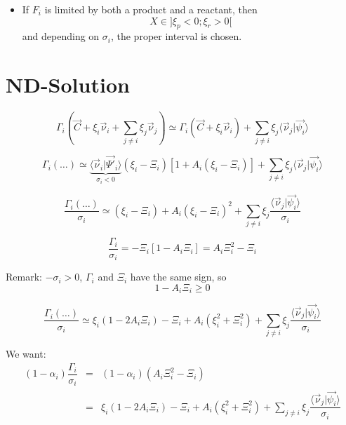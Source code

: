 \documentclass[aps,12pt]{revtex4}
\begin{document}
\begin{itemize}
\begin{itemize}
	\item If $F_i$ is limited by both a product and a reactant, then $$X\in\rbrack \xi_p < 0 ; \xi_r > 0 \lbrack$$
	and depending on $\sigma_i$, the proper interval is chosen.
	\end{itemize}
	
\end{itemize}

\section{ND-Solution} 	


\begin{equation}
	\Gamma_i\left(\vec{C} + \xi_i \vec{\nu}_i + \sum_{j\not=i} \xi_j \vec{\nu}_j \right) 
	\simeq 
	\Gamma_i(\vec{C} + \xi_i \vec{\nu}_i) + \sum_{j\not=i} \xi_j \langle \vec{\nu}_j \vert \vec{\psi_i} \rangle
\end{equation}

\begin{equation}
	\Gamma_i(\ldots) \simeq \underbrace{\langle \vec{\nu}_i \vert \vec{\Psi'}_i\rangle}_{\sigma_i<0} \left(\xi_i - \Xi_i\right)\left[ 1 + A_i \left(\xi_i - \Xi_i\right)\right] + \sum_{j\not=i} \xi_j \langle \vec{\nu}_j \vert \vec{\psi_i} \rangle
\end{equation}

\begin{equation}
	\dfrac{\Gamma_i(\ldots)}{\sigma_i} \simeq (\xi_i - \Xi_i) + A_i (\xi_i - \Xi_i)^2 + \sum_{j\not=i} \xi_j \dfrac{\langle \vec{\nu}_j \vert \vec{\psi_i} \rangle}{\sigma_i}
\end{equation}

\begin{equation}
	\dfrac{\Gamma_i}{\sigma_i} = -\Xi_i \left[ 1 - A_i \Xi_i \right] = A_i\Xi_i^2 - \Xi_i
\end{equation}

Remark: $-\sigma_i>0$, $\Gamma_i$ and $\Xi_i$ have the same sign, so
\begin{equation}
	1-A_i\Xi_i \geq 0
\end{equation}

\begin{equation}
\dfrac{\Gamma_i(\ldots)}{\sigma_i}   \simeq  \xi_i (1-2A_i\Xi_i) - \Xi_i + A_i (\xi_i^2 + \Xi_i^2) + \sum_{j\not=i} \xi_j \dfrac{\langle \vec{\nu}_j \vert \vec{\psi_i} \rangle}{\sigma_i}
\end{equation}

We want:
\begin{equation}
\begin{array}{rcl}
	(1-\alpha_i) \dfrac{\Gamma_i}{\sigma_i} & = & (1-\alpha_i) \left( A_i\Xi_i^2 - \Xi_i\right) \\
	& = & \displaystyle \xi_i (1-2A_i\Xi_i) - \Xi_i + A_i (\xi_i^2 + \Xi_i^2) + \sum_{j\not=i} \xi_j \dfrac{\langle \vec{\nu}_j \vert \vec{\psi_i} \rangle}{\sigma_i}\\
\end{array}
\end{equation}
\end{document}
